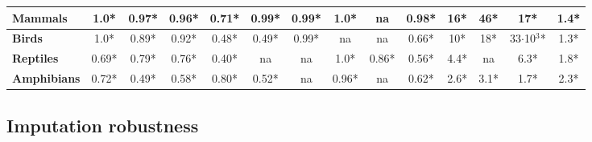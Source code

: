 \documentclass[11pt]{article}
\begin{document}
\begin{table}[h!]
\begin{center}
\begin{tabular}{|l|c|c|c|c|c|c|c|c|c|c|c|c|c|}
\textbf{Mammals}                                      & 1.0*           & 0.97*        & 0.96*          & 0.71*         & 0.99*         & 0.99*         & 1.0*          & na            & 0.98*         & 16*                   & 46*                   & 17*                        & 1.4*                 \\ \hline
\textbf{Birds}                                        & 1.0*           & 0.89*        & 0.92*          & 0.48*         & 0.49*         & 0.99*         & na            & na            & 0.66*         & 10*                   & 18*                   & 33$\cdot$10$^3$*           & 1.3*                 \\ \hline
\textbf{Reptiles}                                     & 0.69*          & 0.79*        & 0.76*          & 0.40*         & na            & na            & 1.0*          & 0.86*         & 0.56*         & 4.4*                  & na                    & 6.3*                       & 1.8*                 \\ \hline
\textbf{Amphibians}                                   & 0.72*          & 0.49*        & 0.58*          & 0.80*         & 0.52*         & na            & 0.96*         & na            & 0.62*         & 2.6*                  & 3.1*                  & 1.7*                       & 2.3*                 \\ \hline
\end{tabular}
\end{center}
\end{table}



\pagebreak
\subsection{Imputation robustness}
\end{document}
